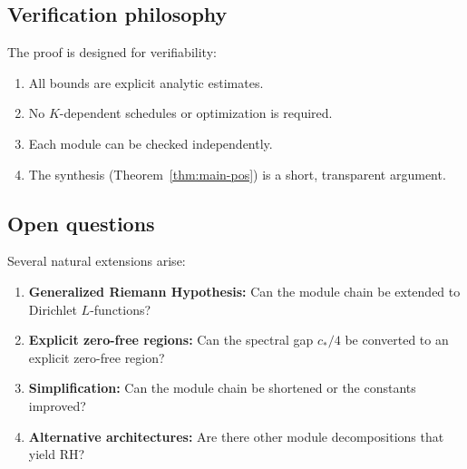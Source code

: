 \documentclass[11pt,a4paper]{article}
\theoremstyle{definition}
\theoremstyle{remark}
\begin{document}
\subsection{Verification philosophy}

The proof is designed for verifiability:
\begin{enumerate}
\item All bounds are explicit analytic estimates.
\item No $K$-dependent schedules or optimization is required.
\item Each module can be checked independently.
\item The synthesis (Theorem~\ref{thm:main-pos}) is a short, transparent argument.
\end{enumerate}

\subsection{Open questions}

Several natural extensions arise:

\begin{enumerate}
\item \textbf{Generalized Riemann Hypothesis:} Can the module chain be extended to Dirichlet $L$-functions?

\item \textbf{Explicit zero-free regions:} Can the spectral gap $c_*/4$ be converted to an explicit zero-free region?

\item \textbf{Simplification:} Can the module chain be shortened or the constants improved?

\item \textbf{Alternative architectures:} Are there other module decompositions that yield RH?
\end{enumerate}

\end{document}
